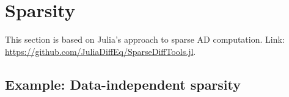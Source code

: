 %
%
%
%
%
%


\section{Sparsity}
This section is based on Julia's approach to sparse AD computation. 
Link: \url{https://github.com/JuliaDiffEq/SparseDiffTools.jl}. 


\subsection{Example: Data-independent sparsity}


